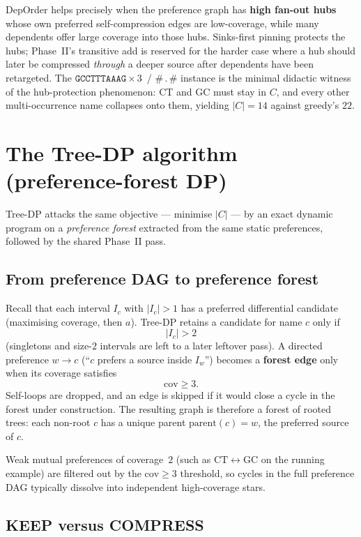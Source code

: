 \documentclass[11pt,a4paper]{article}
\begin{document}
DepOrder helps precisely when the preference graph has \textbf{high
fan-out hubs} whose own preferred self-compression edges are
low-coverage, while many dependents offer large coverage into those
hubs. Sinks-first pinning protects the hubs; Phase~II's transitive add
is reserved for the harder case where a hub should later be compressed
\emph{through} a deeper source after dependents have been retargeted.
The \(\mathtt{GCCTTTAAAG}{\times}3\)~/ \(\mathtt{\#\,.\,\#}\) instance
is the minimal didactic witness of the hub-protection phenomenon: CT
and GC must stay in \(C\), and every other multi-occurrence name
collapses onto them, yielding \(|C|=14\) against greedy's \(22\).

\section{The Tree-DP algorithm
(preference-forest DP)}

Tree-DP attacks the same objective --- minimise \(|C|\) --- by an exact
dynamic program on a \emph{preference forest} extracted from the same
static preferences, followed by the shared Phase~II pass.

\subsection{From preference DAG to preference forest}

Recall that each interval \(I_c\) with \(|I_c|>1\) has a preferred
differential candidate (maximising coverage, then \(a\)). Tree-DP
retains a candidate for name \(c\) only if
\[
|I_c|>2
\]
(singletons and size-\(2\) intervals are left to a later leftover
pass). A directed preference \(w\to c\) (``\(c\) prefers a source
inside \(I_w\)'') becomes a \textbf{forest edge} only when its
coverage satisfies
\[
\mathrm{cov}\ge 3.
\]
Self-loops are dropped, and an edge is skipped if it would close a
cycle in the forest under construction. The resulting graph is
therefore a forest of rooted trees: each non-root \(c\) has a unique
parent \(\mathrm{parent}(c)=w\), the preferred source of \(c\).

Weak mutual preferences of coverage~$2$ (such as
\(\mathrm{CT}\leftrightarrow\mathrm{GC}\) on the running example) are
filtered out by the \(\mathrm{cov}\ge 3\) threshold, so cycles in the
full preference DAG typically dissolve into independent high-coverage
stars.

\subsection{KEEP versus COMPRESS}
\end{document}
